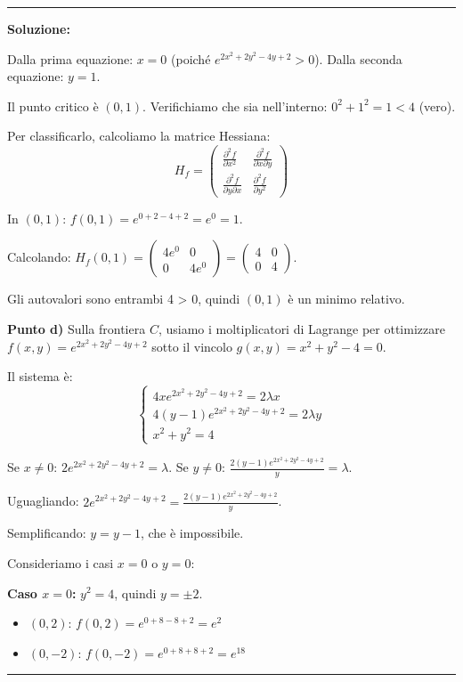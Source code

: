 \documentclass[12pt, a4paper]{article}
\newenvironment{solution}
{\par\noindent\rule{\textwidth}{0.4pt}\par\textbf{Soluzione:}\medskip\par}
{\par\rule{\textwidth}{0.4pt}\par\bigskip}
\begin{document}
\begin{solution}
Dalla prima equazione: $x = 0$ (poiché $e^{2x^{2}+2y^{2}-4y+2} > 0$).
Dalla seconda equazione: $y = 1$.

Il punto critico è $(0, 1)$. Verifichiamo che sia nell'interno: $0^2 + 1^2 = 1 < 4$ (vero).

Per classificarlo, calcoliamo la matrice Hessiana:
\[
H_f = \begin{pmatrix}
\frac{\partial^2 f}{\partial x^2} & \frac{\partial^2 f}{\partial x \partial y} \\
\frac{\partial^2 f}{\partial y \partial x} & \frac{\partial^2 f}{\partial y^2}
\end{pmatrix}
\]

In $(0,1)$: $f(0,1) = e^{0 + 2 - 4 + 2} = e^0 = 1$.

Calcolando: $H_f(0,1) = \begin{pmatrix} 4e^0 & 0 \\ 0 & 4e^0 \end{pmatrix} = \begin{pmatrix} 4 & 0 \\ 0 & 4 \end{pmatrix}$.

Gli autovalori sono entrambi 4 > 0, quindi $(0,1)$ è un minimo relativo.

\vspace{0.5cm}

\textbf{Punto d)} Sulla frontiera $C$, usiamo i moltiplicatori di Lagrange per ottimizzare $f(x,y) = e^{2x^{2}+2y^{2}-4y+2}$ sotto il vincolo $g(x,y) = x^2 + y^2 - 4 = 0$.

Il sistema è:
\[
\begin{cases}
4xe^{2x^{2}+2y^{2}-4y+2} = 2\lambda x \\
4(y-1)e^{2x^{2}+2y^{2}-4y+2} = 2\lambda y \\
x^2 + y^2 = 4
\end{cases}
\]

Se $x \neq 0$: $2e^{2x^{2}+2y^{2}-4y+2} = \lambda$.
Se $y \neq 0$: $\frac{2(y-1)e^{2x^{2}+2y^{2}-4y+2}}{y} = \lambda$.

Uguagliando: $2e^{2x^{2}+2y^{2}-4y+2} = \frac{2(y-1)e^{2x^{2}+2y^{2}-4y+2}}{y}$.

Semplificando: $y = y - 1$, che è impossibile.

Consideriamo i casi $x = 0$ o $y = 0$:

\textbf{Caso $x = 0$:} $y^2 = 4$, quindi $y = \pm 2$.
\begin{itemize}
    \item $(0, 2)$: $f(0, 2) = e^{0 + 8 - 8 + 2} = e^2$
    \item $(0, -2)$: $f(0, -2) = e^{0 + 8 + 8 + 2} = e^{18}$
\end{itemize}


\end{solution}
\end{document}
